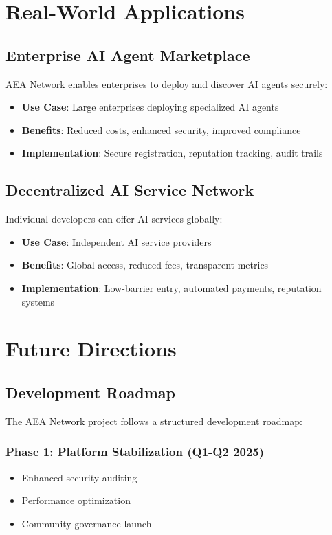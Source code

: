 \documentclass[12pt,a4paper]{article}
\begin{document}
\section{Real-World Applications}

\subsection{Enterprise AI Agent Marketplace}

AEA Network enables enterprises to deploy and discover AI agents securely:

\begin{itemize}
\item \textbf{Use Case}: Large enterprises deploying specialized AI agents
\item \textbf{Benefits}: Reduced costs, enhanced security, improved compliance
\item \textbf{Implementation}: Secure registration, reputation tracking, audit trails
\end{itemize}

\subsection{Decentralized AI Service Network}

Individual developers can offer AI services globally:

\begin{itemize}
\item \textbf{Use Case}: Independent AI service providers
\item \textbf{Benefits}: Global access, reduced fees, transparent metrics
\item \textbf{Implementation}: Low-barrier entry, automated payments, reputation systems
\end{itemize}

\section{Future Directions}

\subsection{Development Roadmap}

The AEA Network project follows a structured development roadmap:

\subsubsection{Phase 1: Platform Stabilization (Q1-Q2 2025)}
\begin{itemize}
\item Enhanced security auditing
\item Performance optimization
\item Community governance launch
\end{itemize}
\end{document}
